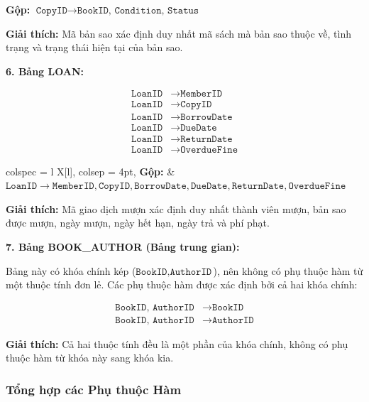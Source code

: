 \documentclass[12pt,a4paper]{article}
\begin{document}
\textbf{Gộp:} $\texttt{CopyID} \rightarrow \texttt{BookID, Condition, Status}$

\textbf{Giải thích:} Mã bản sao xác định duy nhất mã sách mà bản sao thuộc về, tình trạng và trạng thái hiện tại của bản sao.

\vspace{0.5cm}

\textbf{6. Bảng LOAN:}

$$
\begin{aligned}
\texttt{LoanID} &\rightarrow \texttt{MemberID} \\
\texttt{LoanID} &\rightarrow \texttt{CopyID} \\
\texttt{LoanID} &\rightarrow \texttt{BorrowDate} \\
\texttt{LoanID} &\rightarrow \texttt{DueDate} \\
\texttt{LoanID} &\rightarrow \texttt{ReturnDate} \\
\texttt{LoanID} &\rightarrow \texttt{OverdueFine}
\end{aligned}
$$


\begin{tblr}{
  colspec = {l X[l]},
  colsep = 4pt,
}
\textbf{Gộp:} & $\texttt{LoanID} \rightarrow \texttt{MemberID}, \texttt{CopyID}, \texttt{BorrowDate}, \texttt{DueDate}, \texttt{ReturnDate}, \texttt{OverdueFine}$ \\
\end{tblr}

\textbf{Giải thích:} Mã giao dịch mượn xác định duy nhất thành viên mượn, bản sao được mượn, ngày mượn, ngày hết hạn, ngày trả và phí phạt.

\vspace{0.5cm}

\textbf{7. Bảng BOOK\_AUTHOR (Bảng trung gian):}

Bảng này có khóa chính kép ($\texttt{BookID}, \texttt{AuthorID}$), nên không có phụ thuộc hàm từ một thuộc tính đơn lẻ. Các phụ thuộc hàm được xác định bởi cả hai khóa chính:

$$
\begin{aligned}
\texttt{BookID, AuthorID} &\rightarrow \texttt{BookID} \\
\texttt{BookID, AuthorID} &\rightarrow \texttt{AuthorID}
\end{aligned}
$$

\textbf{Giải thích:} Cả hai thuộc tính đều là một phần của khóa chính, không có phụ thuộc hàm từ khóa này sang khóa kia.

\subsubsection{Tổng hợp các Phụ thuộc Hàm}
\end{document}
